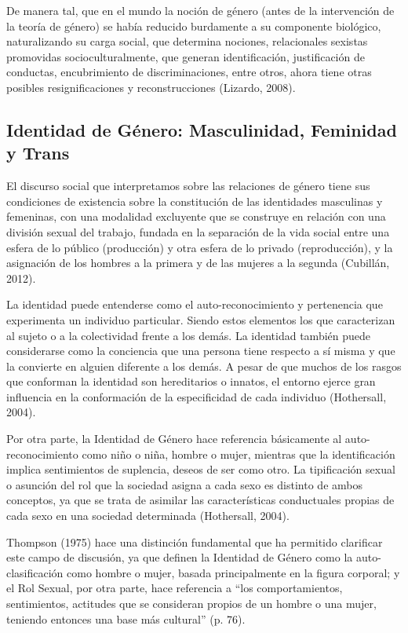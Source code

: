 De manera tal, que en el mundo la noción de género (antes de la intervención de
la teoría de género) se había reducido burdamente a su componente biológico,
naturalizando su carga social, que determina nociones, relacionales sexistas
promovidas socioculturalmente, que generan identificación, justificación de
conductas, encubrimiento de discriminaciones, entre otros, ahora tiene otras
posibles resignificaciones y reconstrucciones (Lizardo, 2008).

\subsection{Identidad de Género: Masculinidad, Feminidad y Trans}
El discurso social que interpretamos sobre las relaciones de género tiene sus
condiciones de existencia sobre la constitución de las identidades masculinas y
femeninas, con una modalidad excluyente que se construye en relación con una
división sexual del trabajo, fundada en la separación de la vida social entre
una esfera de lo público (producción) y otra esfera de lo privado
(reproducción), y la asignación de los hombres a la primera y de las mujeres a
la segunda (Cubillán, 2012).

La identidad puede entenderse como el auto-reconocimiento y pertenencia que
experimenta un individuo particular.
Siendo estos elementos los que caracterizan al sujeto o a la colectividad frente
a los demás.
La identidad también puede considerarse como la conciencia que una persona tiene
respecto a sí misma y que la convierte en alguien diferente a los demás.
A pesar de que muchos de los rasgos que conforman la identidad son hereditarios
o innatos, el entorno ejerce gran influencia en la conformación de la
especificidad de cada individuo (Hothersall, 2004).

Por otra parte, la Identidad de Género hace referencia básicamente al
auto-reconocimiento como niño o niña, hombre o mujer, mientras que la
identificación implica sentimientos de suplencia, deseos de ser como otro.
La tipificación sexual o asunción del rol que la sociedad asigna a cada sexo es
distinto de ambos conceptos, ya que se trata de asimilar las características
conductuales propias de cada sexo en una sociedad determinada (Hothersall,
2004).

Thompson (1975) hace una distinción fundamental que ha permitido clarificar este
campo de discusión, ya que definen la Identidad de Género como la
auto-clasificación como hombre o mujer, basada principalmente en la figura
corporal;
y el Rol Sexual, por otra parte, hace referencia a “los comportamientos,
sentimientos, actitudes que se consideran propios de un hombre
o una mujer, teniendo entonces una base más cultural” (p. 76).

